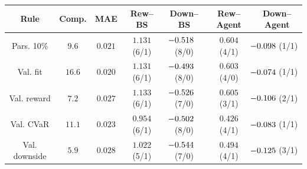 \begingroup
\renewcommand{\arraystretch}{1.16}
\setlength{\tabcolsep}{4.2pt}
\begin{tabular}{@{}ccccccc@{}}
\toprule
Rule & Comp. & MAE & Rew--BS & Down--BS & Rew--Agent & Down--Agent \\
\midrule
Pars. 10\% & $9.6$ & $0.021$ & $1.131$ (6/1) & $\mathllap{-}0.518$ (8/0) & $0.604$ (4/1) & $\mathllap{-}0.098$ (1/1) \\
Val. fit & $16.6$ & $0.020$ & $1.131$ (6/1) & $\mathllap{-}0.493$ (8/0) & $0.603$ (4/0) & $\mathllap{-}0.074$ (1/1) \\
Val. reward & $7.2$ & $0.027$ & $1.133$ (6/1) & $\mathllap{-}0.526$ (7/0) & $0.605$ (3/1) & $\mathllap{-}0.106$ (2/1) \\
Val. CVaR & $11.1$ & $0.023$ & $0.954$ (6/1) & $\mathllap{-}0.502$ (8/0) & $0.426$ (4/1) & $\mathllap{-}0.083$ (1/1) \\
Val. downside & $5.9$ & $0.028$ & $1.022$ (5/1) & $\mathllap{-}0.544$ (7/0) & $0.494$ (4/1) & $\mathllap{-}0.125$ (3/1) \\
\bottomrule
\end{tabular}
\endgroup
